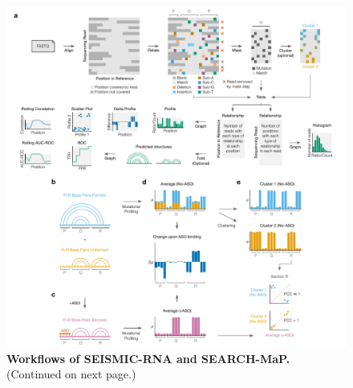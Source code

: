 \documentclass[main.tex]{subfiles}
\begin{document}
\begin{figure}[H]
	\includegraphics[width=\textwidth]{../MainFigures/wf/wf.pdf}
	\caption{\textbf{Workflows of SEISMIC-RNA and SEARCH-MaP.} (Continued on next page.)}
	\label{wf}
\end{figure}
\addtocounter{figure}{-1}
\end{document}
